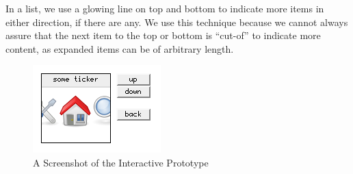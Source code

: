 \begin{description}
    In a list, we use a glowing line on top and bottom to indicate more 
    items in either direction, if there are any. We use this technique 
    because we cannot always assure that the next item to the top or 
    bottom is ``cut-of'' to indicate more content, as expanded items can
    be of arbitrary length.
\begin{figure}[h]
  \begin{center}
    \includegraphics[width=0.8\linewidth]{imgs/screen.png}
  \end{center}
  \caption{A Screenshot of the Interactive Prototype}
  \label{fig:prototype}
\end{figure}
\end{description}

